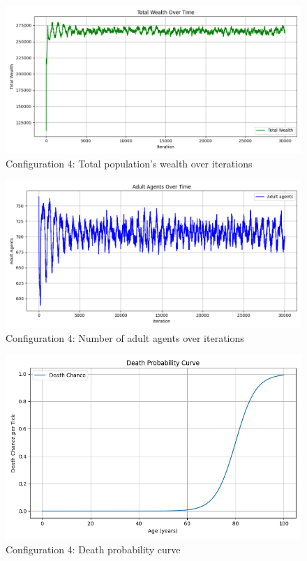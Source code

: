 \documentclass[english]{projectreport}
\begin{document}
    \begin{figure}[H]
        \centering
        \includegraphics[width=0.8\linewidth]{metrics_config4/metrics_config4_total_wealth.png}
        \caption{Configuration 4: Total population's wealth over iterations}
        \label{fig:c0-total_wealth}
    \end{figure}

    \begin{figure}[H]
        \centering
        \includegraphics[width=0.8\linewidth]{metrics_config4/metrics_config4_adult_agents.png}
        \caption{Configuration 4: Number of adult agents over iterations}
        \label{fig:c0-adult_agents}
    \end{figure}

    \begin{figure}[H]
        \centering
        \includegraphics[width=0.8\linewidth]{metrics_config4/metrics_config4_death_probability_curve.png}
        \caption{Configuration 4: Death probability curve}
        \label{fig:c0-death_probability_curve}
    \end{figure}
\end{document}
